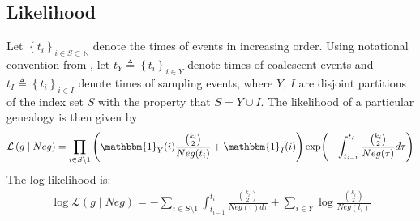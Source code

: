 \documentclass{report}
\newcommand{\N}{\mathbb{N}}
\theoremstyle{definition}
\begin{document}
\subsection{Likelihood}\label{subsection:likelihood}
Let $\left\{t_i\right\}_{i\in S\subset \N}$ denote the times of events in increasing order. Using notational convention from \cite{drummond_estimating_2002}, let $t_Y\triangleq \left\{t_i\right\}_{i\in Y}$ denote times of coalescent events and $t_I\triangleq \left\{t_i\right\}_{i\in I}$ denote times of sampling events, where $Y$, $I$ are disjoint partitions of the index set $S$ with the property that $S = Y\cup I$.
The likelihood of a particular genealogy is then given by:
\begin{gather}
\mathcal{L}\left(g\mid Neg\right) 
= \prod_{i\in S\setminus 1}\left(\mathbbm{1}_Y(i)\frac{\binom{k_{i}}{2}}{Neg(t_i)}+\mathbbm{1}_I(i)\right)
\exp(-\int_{t_{i-1}}^{t_i}\frac{\binom{k_{i}}{2}}{Neg(\tau)}d\tau)
\end{gather}
The log-likelihood is:
\begin{gather}
\log\mathcal{L}\left(g\mid Neg\right) 
= -\sum_{i\in S\setminus 1}{\int_{t_{i-1}}^{t_i}{\frac{\binom{k_{i}}{2}}{Neg(\tau)d\tau}}} + \sum_{i\in Y}{\log\frac{\binom{k_{i}}{2}}{Neg(t_i)}}
\end{gather}
\end{document}
